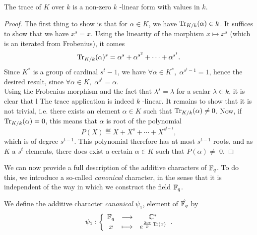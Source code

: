 \begin{prop}
The trace of $ K $ over $ k $ is a non-zero $ k $ -linear form with values in $ k $.
\end{prop}
\begin{proof}
 The first thing to show is that for $ \alpha \in K $, we have $ \operatorname{Tr}_{K / k} (\alpha) \in k $. It suffices to show that we have $ x^s = x $. Using the linearity of the morphism $ x \mapsto x^s $ (which is an iterated from Frobenius), it comes
\begin{equation*}
\operatorname{Tr}_{K / k} (\alpha)^s = \alpha^s + \alpha^{s^2} + \cdots + \alpha^{s^t}.
\end{equation*}
Since $ K^* $ is a group of cardinal $ s^t-1 $, we have $ \forall \alpha \in K^*, \; \alpha^{s^t-1} = 1 $, hence the desired result, since $ \forall \alpha \in K, \; \alpha^{s^t} = \alpha $. \\Using the Frobenius morphism and the fact that $ \lambda^s = \lambda $ for a scalar $ \lambda \in k $, it is clear that l The trace application is indeed $ k $ -linear. It remains to show that it is not trivial, i.e. there exists an element $ \alpha \in K $ such that $ \operatorname{Tr}_{K / k} (\alpha) \neq 0 $. Now, if $ \operatorname{Tr}_{K / k} (\alpha) = 0 $, this means that $ \alpha $ is root of the polynomial
\begin{equation*}
P (X) \eqdef X + X^s + \cdots + X^{s^{t-1}},
\end{equation*}
which is of degree $ s^{t-1} $. This polynomial therefore has at most $ s^{t-1} $ roots, and as $ K $ a $ s^t $ elements, there does exist a certain $ \alpha \in K $ such that $ P (\alpha) \neq $ 0.
\end{proof}
 
We can now provide a full description of the additive characters of $ \mathbb{F}_q $.
To do this, we introduce a so-called \textit{canonical} character, in the sense
that it is independent of the way in which we construct the field $ \mathbb{F}_q $.
 
\begin{defn}
\label{defn-character-additive-canonical}
 \label{notation-27} We define the additive character \textit{canonical} $ \psi_1 $, element of $ \hat{\mathbb{F}_q} $ by
\begin{equation*}
\psi_1: {\left\{ \begin{array}{ccc} \mathbb{F}_q & \longrightarrow & \mathbb{C}^* \\ x & \longmapsto & e^{\frac{2 \imath \pi}{p} \operatorname{Tr} (x)} \end{array} \right.}.
\end{equation*}
\end{defn}
 
